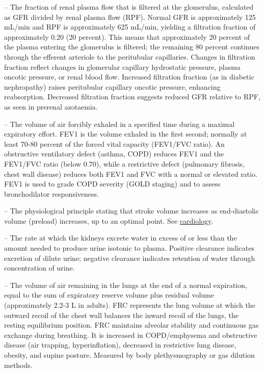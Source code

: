 -- The fraction of renal plasma flow that is filtered at the glomerulus, calculated as GFR divided by renal plasma flow (RPF). Normal GFR is approximately 125 mL/min and RPF is approximately 625 mL/min, yielding a filtration fraction of approximately 0.20 (20 percent). This means that approximately 20 percent of the plasma entering the glomerulus is filtered; the remaining 80 percent continues through the efferent arteriole to the peritubular capillaries. Changes in filtration fraction reflect changes in glomerular capillary hydrostatic pressure, plasma oncotic pressure, or renal blood flow. Increased filtration fraction (as in diabetic nephropathy) raises peritubular capillary oncotic pressure, enhancing reabsorption. Decreased filtration fraction suggests reduced GFR relative to RPF, as seen in prerenal azotaemia.

-- The volume of air forcibly exhaled in a specified time during a maximal expiratory effort. FEV1 is the volume exhaled in the first second; normally at least 70-80 percent of the forced vital capacity (FEV1/FVC ratio). An obstructive ventilatory defect (asthma, COPD) reduces FEV1 and the FEV1/FVC ratio (below 0.70), while a restrictive defect (pulmonary fibrosis, chest wall disease) reduces both FEV1 and FVC with a normal or elevated ratio. FEV1 is used to grade COPD severity (GOLD staging) and to assess bronchodilator responsiveness.

-- The physiological principle stating that stroke volume increases as end-diastolic volume (preload) increases, up to an optimal point. See \hyperlink{Cardiology}{cardiology}.

-- The rate at which the kidneys excrete water in excess of or less than the amount needed to produce urine isotonic to plasma. Positive clearance indicates excretion of dilute urine; negative clearance indicates retention of water through concentration of urine.

-- The volume of air remaining in the lungs at the end of a normal expiration, equal to the sum of expiratory reserve volume plus residual volume (approximately 2.2-3 L in adults). FRC represents the lung volume at which the outward recoil of the chest wall balances the inward recoil of the lungs, the resting equilibrium position. FRC maintains alveolar stability and continuous gas exchange during breathing. It is increased in COPD/emphysema and obstructive disease (air trapping, hyperinflation), decreased in restrictive lung disease, obesity, and supine posture. Measured by body plethysmography or gas dilution methods.

